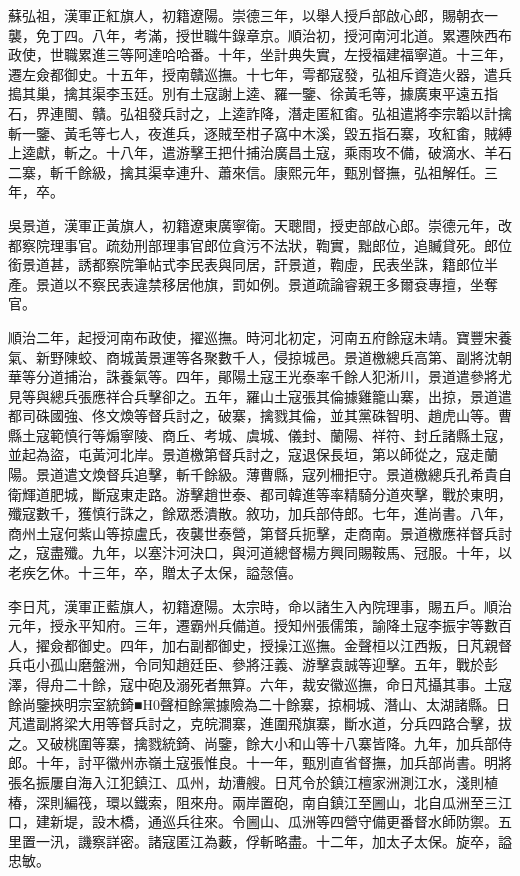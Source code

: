 \begin{pinyinscope}
蘇弘祖，漢軍正紅旗人，初籍遼陽。崇德三年，以舉人授戶部啟心郎，賜朝衣一襲，免丁四。八年，考滿，授世職牛錄章京。順治初，授河南河北道。累遷陜西布政使，世職累進三等阿達哈哈番。十年，坐計典失實，左授福建福寧道。十三年，遷左僉都御史。十五年，授南贛巡撫。十七年，雩都寇發，弘祖斥資造火器，遣兵搗其巢，擒其渠李玉廷。別有土寇謝上逵、羅一鑒、徐黃毛等，據廣東平遠五指石，界連閩、贛。弘祖發兵討之，上逵詐降，潛走匿紅畬。弘祖遣將李宗韜以計擒斬一鑒、黃毛等七人，夜進兵，逐賊至柑子窩中木溪，毀五指石寨，攻紅畬，賊縛上逵獻，斬之。十八年，遣游擊王把什捕治廣昌土寇，乘雨攻不備，破滴水、羊石二寨，斬千餘級，擒其渠幸連升、蕭來信。康熙元年，甄別督撫，弘祖解任。三年，卒。

吳景道，漢軍正黃旗人，初籍遼東廣寧衛。天聰間，授吏部啟心郎。崇德元年，改都察院理事官。疏劾刑部理事官郎位貪污不法狀，鞫實，黜郎位，追贓貸死。郎位銜景道甚，誘都察院筆帖式李民表與同居，訐景道，鞫虛，民表坐誅，籍郎位半產。景道以不察民表違禁移居他旗，罰如例。景道疏論睿親王多爾袞專擅，坐奪官。

順治二年，起授河南布政使，擢巡撫。時河北初定，河南五府餘寇未靖。寶豐宋養氣、新野陳蛟、商城黃景運等各聚數千人，侵掠城邑。景道檄總兵高第、副將沈朝華等分道捕治，誅養氣等。四年，鄖陽土寇王光泰率千餘人犯淅川，景道遣參將尤見等與總兵張應祥合兵擊卻之。五年，羅山土寇張其倫據雞籠山寨，出掠，景道遣都司硃國強、佟文煥等督兵討之，破寨，擒戮其倫，並其黨硃智明、趙虎山等。曹縣土寇範慎行等煽寧陵、商丘、考城、虞城、儀封、蘭陽、祥符、封丘諸縣土寇，並起為盜，屯黃河北岸。景道檄第督兵討之，寇退保長垣，第以師從之，寇走蘭陽。景道遣文煥督兵追擊，斬千餘級。薄曹縣，寇列柵拒守。景道檄總兵孔希貴自衛輝道肥城，斷寇東走路。游擊趙世泰、都司韓進等率精騎分道夾擊，戰於東明，殲寇數千，獲慎行誅之，餘眾悉潰散。敘功，加兵部侍郎。七年，進尚書。八年，商州土寇何紫山等掠盧氏，夜襲世泰營，第督兵扼擊，走商南。景道檄應祥督兵討之，寇盡殲。九年，以塞汴河決口，與河道總督楊方興同賜鞍馬、冠服。十年，以老疾乞休。十三年，卒，贈太子太保，謚愨僖。

李日芃，漢軍正藍旗人，初籍遼陽。太宗時，命以諸生入內院理事，賜五戶。順治元年，授永平知府。三年，遷霸州兵備道。授知州張儒策，諭降土寇李振宇等數百人，擢僉都御史。四年，加右副都御史，授操江巡撫。金聲桓以江西叛，日芃親督兵屯小孤山磨盤洲，令同知趙廷臣、參將汪義、游擊袁誠等迎擊。五年，戰於彭澤，得舟二十餘，寇中砲及溺死者無算。六年，裁安徽巡撫，命日芃攝其事。土寇餘尚鑒挾明宗室統錡■H0聲桓餘黨據險為二十餘寨，掠桐城、潛山、太湖諸縣。日芃遣副將梁大用等督兵討之，克皖澗寨，進圍飛旗寨，斷水道，分兵四路合擊，拔之。又破桃圍等寨，擒戮統錡、尚鑒，餘大小和山等十八寨皆降。九年，加兵部侍郎。十年，討平徽州赤嶺土寇張惟良。十一年，甄別直省督撫，加兵部尚書。明將張名振屢自海入江犯鎮江、瓜州，劫漕艘。日芃令於鎮江檀家洲測江水，淺則植椿，深則編筏，環以鐵索，阻來舟。兩岸置砲，南自鎮江至圌山，北自瓜洲至三江口，建新堤，設木橋，通巡兵往來。令圌山、瓜洲等四營守備更番督水師防禦。五里置一汛，譏察詳密。諸寇匿江為藪，俘斬略盡。十二年，加太子太保。旋卒，謚忠敏。


\end{pinyinscope}
